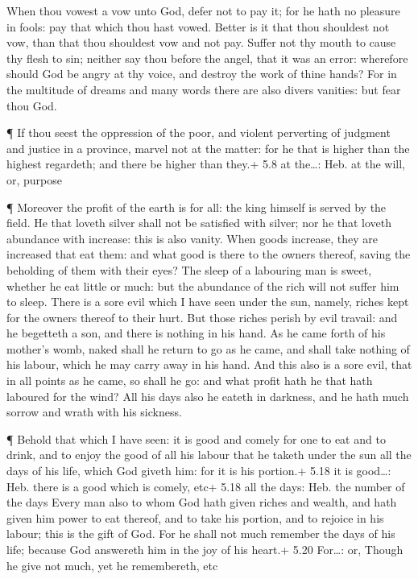  When thou vowest a vow unto God, defer not to pay it; for
he hath no pleasure in fools: pay that which thou hast vowed.
 Better is it that thou shouldest not vow, than that thou
shouldest vow and not pay.  Suffer not thy mouth to cause
thy flesh to sin; neither say thou before the angel, that it was an
error: wherefore should God be angry at thy voice, and destroy the work
of thine hands?  For in the multitude of dreams and many
words there are also divers vanities: but fear thou God.

 ¶ If thou seest the oppression of the poor, and violent
perverting of judgment and justice in a province, marvel not at the
matter: for he that is higher than the highest regardeth; and there be
higher than they.+ 5.8 at the\ldots: Heb. at the will, or, purpose

 ¶ Moreover the profit of the earth is for all: the king
himself is served by the field.  He that loveth silver
shall not be satisfied with silver; nor he that loveth abundance with
increase: this is also vanity.  When goods increase, they
are increased that eat them: and what good is there to the owners
thereof, saving the beholding of them with their eyes?  The
sleep of a labouring man is sweet, whether he eat little or much: but
the abundance of the rich will not suffer him to sleep. 
There is a sore evil which I have seen under the sun, namely, riches
kept for the owners thereof to their hurt.  But those
riches perish by evil travail: and he begetteth a son, and there is
nothing in his hand.  As he came forth of his mother's
womb, naked shall he return to go as he came, and shall take nothing of
his labour, which he may carry away in his hand.  And this
also is a sore evil, that in all points as he came, so shall he go: and
what profit hath he that hath laboured for the wind?  All
his days also he eateth in darkness, and he hath much sorrow and wrath
with his sickness.

 ¶ Behold that which I have seen: it is good and comely for
one to eat and to drink, and to enjoy the good of all his labour that he
taketh under the sun all the days of his life, which God giveth him: for
it is his portion.+ 5.18 it is good\ldots: Heb. there is a good which is
comely, etc+ 5.18 all the days: Heb. the number of the days
 Every man also to whom God hath given riches and wealth,
and hath given him power to eat thereof, and to take his portion, and to
rejoice in his labour; this is the gift of God.  For he
shall not much remember the days of his life; because God answereth him
in the joy of his heart.+ 5.20 For\ldots: or, Though he give not much,
yet he remembereth, etc

